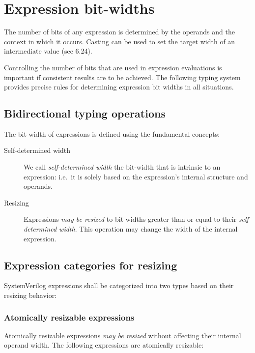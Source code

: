 \documentclass{article}
\newcommand{\sds}{\emph{self-determined width}}
\newcommand{\mbr}{\emph{may be resized}}
\begin{document}
\section{Expression bit-widths}%
\label{expression-bit-widths}

The number of bits of any expression is determined by the operands and the
context in which it occurs. Casting can be used to set the target width of an
intermediate value (see 6.24).

Controlling the number of bits that are used in expression evaluations is
important if consistent results are to be achieved. The following typing system
provides precise rules for determining expression bit widths in all situations.

\subsection{Bidirectional typing operations}%

The bit width of expressions is defined using the fundamental concepts:

\begin{description}
  \item[Self-determined width]
    We call \sds{} the bit-width that is intrinsic to an expression: i.e.~it is
    solely based on the expression's internal structure and operands.

  \item[Resizing]
    Expressions \mbr{} to bit-widths greater than or equal to their \sds{}. This
    operation may change the width of the internal expression.
\end{description}

\subsection{Expression categories for resizing}%

SystemVerilog expressions shall be categorized into two types based on their
resizing behavior:

\subsubsection{Atomically resizable expressions}%

Atomically resizable expressions \mbr{} without affecting their
internal operand width. The following expressions are atomically resizable:
\end{document}
